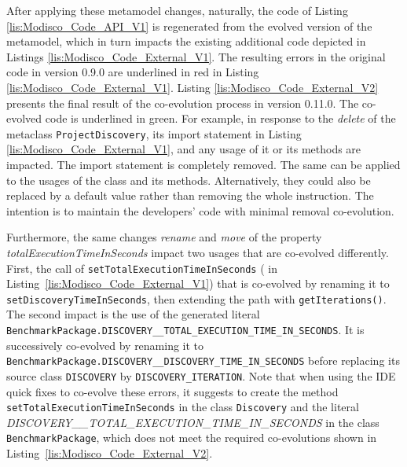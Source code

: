 After applying these metamodel changes, naturally, the code of Listing \ref{lis:Modisco_Code_API_V1} is regenerated from the evolved version of the metamodel, which in turn impacts the existing additional code depicted in Listings \ref{lis:Modisco_Code_External_V1}. 
The resulting errors in the original code in version 0.9.0 are underlined in red in Listing \ref{lis:Modisco_Code_External_V1}. 
Listing \ref{lis:Modisco_Code_External_V2} presents the final result of the co-evolution process in version 0.11.0. The co-evolved code is underlined in green. 
For example, in response to the \textit{delete} of the metaclass \texttt{ProjectDiscovery}, its import statement {\small{}} in Listing \ref{lis:Modisco_Code_External_V1}, and any usage of it or its methods are impacted. The import statement is completely removed. The same can be applied to the usages of the class and its methods. Alternatively, they could also be replaced by a default value rather than removing the whole instruction. The intention is to maintain the developers' code with minimal removal co-evolution. 

Furthermore, the same changes \textit{rename} and \textit{move} of the property \emph{totalExecutionTimeInSeconds} impact two usages that are co-evolved differently. First, the call of \texttt{setTotalExecutionTimeInSeconds} ({\small{}} in Listing~\ref{lis:Modisco_Code_External_V1}) that is co-evolved by renaming it to \texttt{setDiscoveryTimeInSeconds}, then extending the path with \texttt{getIterations()}. The second impact is the use of the generated literal %
\texttt{\footnotesize{BenchmarkPackage.DISCOVERY\_\_TOTAL\_EXECUTION\_TIME\_IN\_SECONDS}}. It is successively co-evolved by renaming it to \texttt{\footnotesize{BenchmarkPackage.DISCOVERY\_\_DISCOVERY\_TIME\_IN\_SECONDS}} before replacing its source class \texttt{DISCOVERY} by \texttt{DISCOVERY\_ITERATION}. 
Note that when using the IDE quick fixes to co-evolve these errors, it suggests to create the method \texttt{setTotalExecutionTimeInSeconds} in the class \texttt{Discovery} and the literal \emph{\footnotesize{DISCOVERY\_\_TOTAL\_EXECUTION\_TIME\_IN\_SECONDS}} in the class \texttt{BenchmarkPackage}, which does not meet the required co-evolutions shown in Listing~\ref{lis:Modisco_Code_External_V2}.

